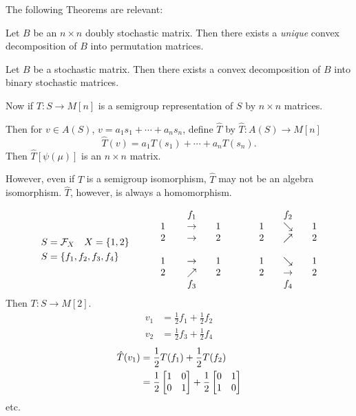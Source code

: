      The following Theorems are relevant:

\begin{theorem}[Birkoff]	\label{thm:3.11}
Let $B$ be an $n \times n$ doubly stochastic matrix.  
Then there exists a \textsl{unique} convex decomposition of $B$ into permutation matrices.
\end{theorem}

\begin{theorem}		\label{thm:3.12} 
Let $B$ be a stochastic matrix.  
Then there exists a convex decomposition of $B$ into binary stochastic matrices.

Now if $T: S \to M[n]$ is a semigroup representation of $S$ by $n \times n$ matrices.

Then for $v \in A(S)$, $v = a_1s_1 + \cdots + a_ns_n$, define $\hat T$ by $\hat T: A(S) \to M[n]$
\[
     \hat T(v) = a_1T(s_1) + \cdots + a_nT(s_n).
\]
Then $\hat T[\psi(\mu)]$ is an $n \times n $ matrix.
\end{theorem}

 However, even if $T$ is a semigroup isomorphism,
$\hat T$ may not be an algebra isomorphism.  
$\hat T$, however, is always a homomorphism.

\begin{example}		\label{exm:3.7}
\[
\begin{aligned}
       S &= \mathcal{F}_X \quad X = \{ 1,2 \} \\
       S &= \{ f_1,f_2,f_3,f_4 \}
\end{aligned}
     \qquad \quad
\begin{matrix}
       &\quad f_1   &            &\qquad &   &\quad f_2       &     \\
    1  &\quad \to   &\quad 1     &       &1  &\quad \searrow  &\quad 1    \\
    2  &\quad \to   &\quad 2     &       &2  &\quad \nearrow  &\quad 2    \\
 \quad    \\
    1  &\quad \to   &\quad 1     &       &1  &\quad \searrow  &\quad 1    \\
    2  &\quad \nearrow &\quad 2  &       &2  &\quad \to       &\quad 2    \\
       &\quad f_3   &            &       &   &\quad f_4
\end{matrix}
\]
Then $T: S \to M[2]$.
\[
\begin{aligned}
       v_1 &= \frac{1}{2} f_1 + \frac{1}{2} f_2    \\
       v_2 &= \frac{1}{2} f_3 + \frac{1}{2} f_4
\end{aligned}
\]
\[
\begin{aligned}
       \hat T(v_1) &= \frac{1}{2} T(f_1) + \frac{1}{2} T(f_2)  \\
       \vspace{2\jot}
       &= \frac{1}{2} \bmatrix
                    1 &0 \\ 0 &1 \endbmatrix
               + \frac{1}{2} \bmatrix
                    0 &1 \\ 1 &0 \endbmatrix
\end{aligned}
\]
etc.
\end{example}

